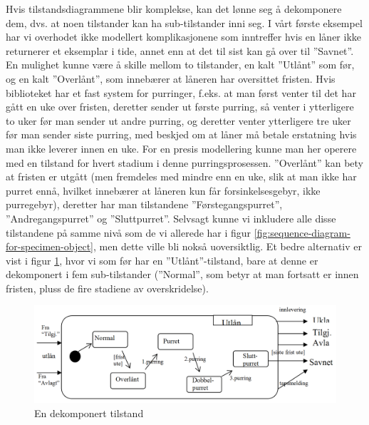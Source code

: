 Hvis tilstandsdiagrammene blir komplekse, kan det lønne seg å dekomponere dem, dvs. at noen tilstander kan ha sub-tilstander inni seg. I vårt første eksempel har vi overhodet ikke modellert komplikasjonene som inntreffer hvis en låner ikke returnerer et eksemplar i tide, annet enn at det til sist kan gå over til ”Savnet”. En mulighet kunne være å skille mellom to tilstander, en kalt ”Utlånt” som før, og en kalt ”Overlånt”, som innebærer at låneren har oversittet fristen. Hvis biblioteket har et fast system for purringer, f.eks. at man først venter til det har gått en uke over fristen, deretter sender ut første purring, så venter i ytterligere to uker før man sender ut andre purring, og deretter venter ytterligere tre uker før man sender siste purring, med beskjed om at låner må betale erstatning hvis man ikke leverer innen en uke. For en presis modellering kunne man her operere med en tilstand for hvert stadium i denne purringsprosessen. ”Overlånt” kan bety at fristen er utgått (men fremdeles med mindre enn en uke, slik at man ikke har purret ennå, hvilket innebærer at låneren kun får forsinkelsesgebyr, ikke purregebyr), deretter har man tilstandene ”Førstegangspurret”, ”Andregangspurret” og ”Sluttpurret”. Selvsagt kunne vi inkludere alle disse tilstandene på samme nivå som de vi allerede har i figur \ref{fig:sequence-diagram-for-specimen-object}, men dette ville bli nokså uoversiktlig. Et bedre alternativ er vist i figur \ref{fig:decomposed-state-example}, hvor vi som før har en ”Utlånt”-tilstand, bare at denne er dekomponert i fem sub-tilstander (”Normal”, som betyr at man fortsatt er innen fristen, pluss de fire stadiene av overskridelse).

\begin{figure}[H]
    \centering
    \includegraphics[scale=0.35]{resources/decomposed-state-example.PNG}
    \caption{En dekomponert tilstand}
    \label{fig:decomposed-state-example}
\end{figure}


